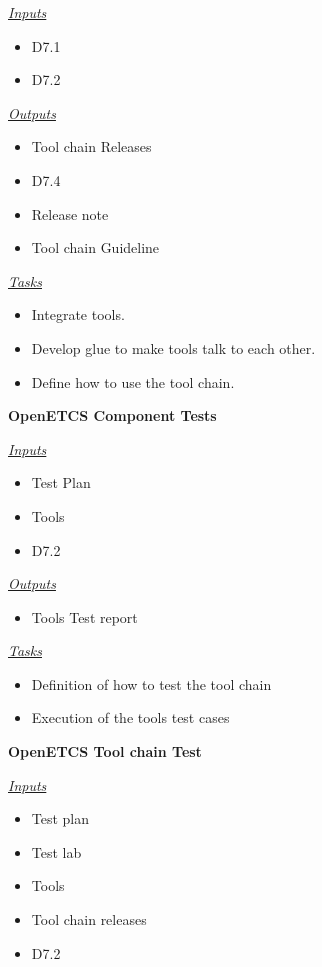 \documentclass{template/openetcs_article}
\begin{document}
\begin{description}
\underline{\textit{Inputs}}
\begin{itemize}
\item  D7.1
\item D7.2
\end{itemize}


\underline{\textit{Outputs}}
\begin{itemize}
\item Tool chain  Releases
\item D7.4
\item Release note
\item Tool chain Guideline
\end{itemize}

\underline{\textit{Tasks}}
\begin{itemize}
\item Integrate tools.
\item Develop glue to make tools talk to each other.
\item Define how to use the tool chain.
\end{itemize}

\item \textbf{OpenETCS  Component  Tests}

\underline{\textit{Inputs}}
\begin{itemize}
\item Test Plan
\item Tools
\item D7.2
\end{itemize}


\underline{\textit{Outputs}}
\begin{itemize}
\item Tools Test report
\end{itemize}

\underline{\textit{Tasks}}
\begin{itemize}
\item Definition of how to test the tool chain
\item Execution of the tools test cases
\end{itemize}

\item \textbf{OpenETCS Tool chain Test}

\underline{\textit{Inputs}}
\begin{itemize}
\item Test plan
\item Test lab
\item Tools
\item Tool chain releases 
\item D7.2
\end{itemize}



\end{description}
\end{document}
